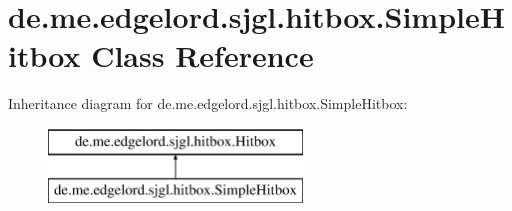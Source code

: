 \hypertarget{classde_1_1me_1_1edgelord_1_1sjgl_1_1hitbox_1_1_simple_hitbox}{}\section{de.\+me.\+edgelord.\+sjgl.\+hitbox.\+Simple\+Hitbox Class Reference}
\label{classde_1_1me_1_1edgelord_1_1sjgl_1_1hitbox_1_1_simple_hitbox}
Inheritance diagram for de.\+me.\+edgelord.\+sjgl.\+hitbox.\+Simple\+Hitbox\+:\begin{figure}[H]
\begin{center}
\leavevmode
\includegraphics[height=2.000000cm]{classde_1_1me_1_1edgelord_1_1sjgl_1_1hitbox_1_1_simple_hitbox}
\end{center}
\end{figure}
